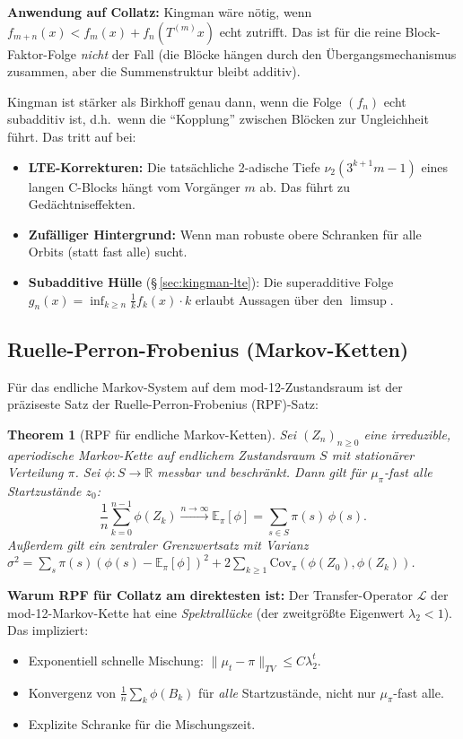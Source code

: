 \documentclass[12pt,a4paper]{article}
\newtheorem{theorem}[definition]{Theorem}
\newcommand{\vii}{\nu_2}
\newcommand{\R}{\mathbb{R}}
\newcommand{\Epi}{\mathbb{E}_\pi}
\begin{document}
\textbf{Anwendung auf Collatz:}
Kingman wäre nötig, wenn $f_{m+n}(x) < f_m(x) + f_n(T^{(m)}x)$ echt
zutrifft. Das ist für die reine Block-Faktor-Folge \emph{nicht} der Fall
(die Blöcke hängen durch den Übergangsmechanismus zusammen, aber die
Summenstruktur bleibt additiv).

\begin{tcolorbox}[kingman, title={Wann Kingman gegenüber Birkhoff Mehrwert hat}]
Kingman ist stärker als Birkhoff genau dann, wenn die Folge $(f_n)$ echt
subadditiv ist, d.h.\ wenn die ``Kopplung'' zwischen Blöcken zur
Ungleichheit führt. Das tritt auf bei:
\begin{itemize}[nosep]
  \item \textbf{LTE-Korrekturen:} Die tatsächliche 2-adische Tiefe
    $\vii(3^{k+1}m-1)$ eines langen C-Blocks hängt vom Vorgänger $m$
    ab. Das führt zu Gedächtniseffekten.
  \item \textbf{Zufälliger Hintergrund:} Wenn man robuste obere Schranken
    für alle Orbits (statt fast alle) sucht.
  \item \textbf{Subadditive Hülle} (§\,\ref{sec:kingman-lte}): Die
    superadditive Folge $g_n(x) = \inf_{k\geq n} \frac{1}{k}f_k(x)\cdot k$
    erlaubt Aussagen über den $\limsup$.
\end{itemize}
\end{tcolorbox}

\subsection{Ruelle-Perron-Frobenius (Markov-Ketten)}

Für das endliche Markov-System auf dem mod-12-Zustandsraum ist der
präziseste Satz der Ruelle-Perron-Frobenius (RPF)-Satz:

\begin{theorem}[RPF für endliche Markov-Ketten]
\label{thm:rpf}
Sei $(Z_n)_{n\geq 0}$ eine irreduzible, aperiodische Markov-Kette auf
endlichem Zustandsraum $S$ mit stationärer Verteilung $\pi$. Sei
$\phi: S \to \R$ messbar und beschränkt. Dann gilt für $\mu_\pi$-fast alle
Startzustände $z_0$:
\[
  \frac{1}{n}\sum_{k=0}^{n-1}\phi(Z_k) \xrightarrow{n\to\infty} \Epi[\phi]
  = \sum_{s \in S} \pi(s)\,\phi(s).
\]
Außerdem gilt ein zentraler Grenzwertsatz mit Varianz
$\sigma^2 = \sum_{s}\pi(s)(\phi(s) - \Epi[\phi])^2 + 2\sum_{k\geq 1}\mathrm{Cov}_\pi(\phi(Z_0), \phi(Z_k))$.
\end{theorem}

\textbf{Warum RPF für Collatz am direktesten ist:} Der Transfer-Operator
$\mathcal{L}$ der mod-12-Markov-Kette hat eine \emph{Spektrallücke}
(der zweitgrößte Eigenwert $\lambda_2 < 1$). Das impliziert:
\begin{itemize}
  \item Exponentiell schnelle Mischung: $\|\mu_t - \pi\|_{TV} \leq C\lambda_2^t$.
  \item Konvergenz von $\frac{1}{n}\sum_{k}\phi(B_k)$ für \emph{alle}
    Startzustände, nicht nur $\mu_\pi$-fast alle.
  \item Explizite Schranke für die Mischungszeit.
\end{itemize}
\end{document}
